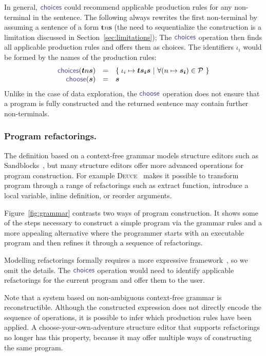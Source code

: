 \documentclass[nonacm,anonymous,sigplan,screen]{acmart}
\newcommand{\ident}[1]{\textsf{\color{DarkSlateBlue}{#1}}}
\newcommand{\select}{\textnormal{\ident{choose}}}
\newcommand{\choices}{\textnormal{\ident{choices}}}
\begin{document}
In general, $\choices$ could recommend applicable production rules for any
non-terminal in the sentence. The following always rewrites the first non-terminal by assuming
a sentence of a form $\boldsymbol{t}n\boldsymbol{s}$ (the need to sequentialize the construction
is a limitation discussed in Section~\ref{sec:limitations}); The $\choices$ operation then finds
all applicable production rules and offers them as choices. The identifiers
$\iota_i$ would be formed by the names of the production rules:
\[
\begin{array}{rcl}
\choices(\boldsymbol{t}n\boldsymbol{s}) &=& \{\; \iota_i \mapsto \boldsymbol{t}\boldsymbol{s_i}\boldsymbol{s} ~|~ \forall (n\mapsto\boldsymbol{s_i})\in \mathcal{P} ~\}\\
\select(\boldsymbol{s}) &=& \boldsymbol{s}
\end{array}
\]
Unlike in the case of data exploration, the $\select$ operation does not ensure
that a program is fully constructed and the returned sentence may contain further non-terminals.

\subsubsection*{Program refactorings.}
The definition based on a context-free grammar models structure
editors such as Sandblocks~\cite{beckmann-2023-all}, but many structure editors offer more
advanced operations for program construction. For example \textsc{Deuce}~\cite{hempel-2018-deuce}
makes it possible to transform program through a range of refactorings such as extract function,
introduce a local variable, inline definition, or reorder arguments.

Figure~\ref{fig:grammar} contrasts two ways of program construction.
It shows some of the steps necessary to construct a simple program via the grammar rules and
a more appealing alternative where the programmer starts
with an executable program and then refines it through a sequence of refactorings.

Modelling refactorings formally requires a more expressive framework~\cite{steimann-2011-refactoring},
so we omit the details. The $\choices$ operation would need to identify applicable refactorings
for the current program and offer them to the user.

Note that a system based on non-ambiguous context-free grammar
is reconstructible. Although the constructed expression does not directly encode the
sequence of operations, it is possible to infer which production rules have been applied.
A choose-your-own-adventure structure editor that supports refactorings no longer has this
property, because it may offer multiple ways of constructing the same program.
\end{document}

